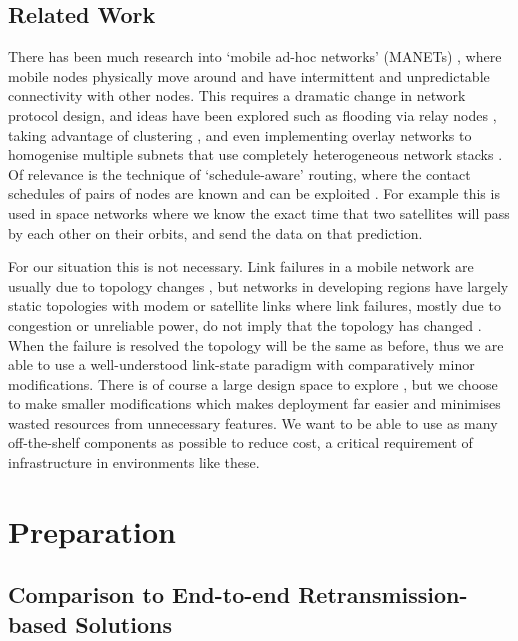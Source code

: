 \documentclass[withindex,glossary,openany]{cam-thesis}
\begin{document}
\section{Related Work}

There has been much research into `mobile ad-hoc networks' (MANETs) \cite{ABOLHASAN2004}, where mobile nodes physically move around and have intermittent and unpredictable connectivity with other nodes. This requires a dramatic change in network protocol design, and ideas have been explored such as flooding via relay nodes \cite{CLAUSEN2003}, taking advantage of clustering \cite{ONUR2022}, and even implementing overlay networks to homogenise multiple subnets that use completely heterogeneous network stacks \cite{SCOTT2007}. Of relevance is the technique of `schedule-aware' routing, where the contact schedules of pairs of nodes are known and can be exploited \cite{GARETTO2009}. For example this is used in space networks where we know the exact time that two satellites will pass by each other on their orbits, and send the data on that prediction.

For our situation this is not necessary. Link failures in a mobile network are usually due to topology changes \cite{DIVECHA2007}, but networks in developing regions have largely static topologies with modem or satellite links where link failures, mostly due to congestion or unreliable power, do not imply that the topology has changed \cite{DEMMER2007}. When the failure is resolved the topology will be the same as before, thus we are able to use a well-understood link-state paradigm with comparatively minor modifications. There is of course a large design space to explore \cite{FARRELL2006}, but we choose to make smaller modifications which makes deployment far easier and minimises wasted resources from unnecessary features. We want to be able to use as many off-the-shelf components as possible to reduce cost, a critical requirement of infrastructure in environments like these.


\chapter{Preparation}

\section{Comparison to End-to-end Retransmission-based Solutions}
\label{sec:retransmission}
\end{document}
